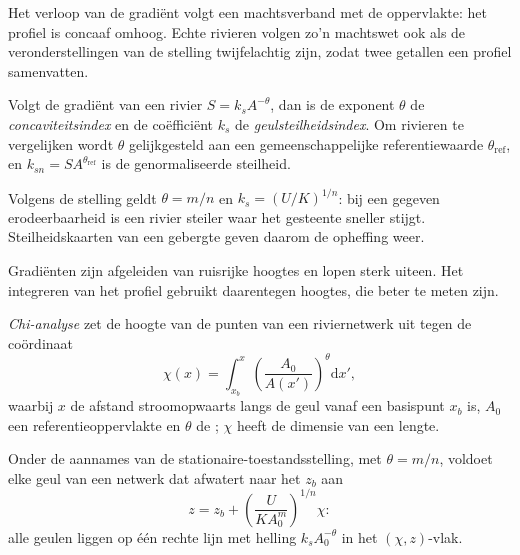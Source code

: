Het verloop van de gradiënt volgt een machtsverband met de oppervlakte: het profiel is
concaaf omhoog. Echte rivieren volgen zo'n machtswet ook als de veronderstellingen van de stelling
twijfelachtig zijn, zodat twee getallen een profiel samenvatten.

\begin{definition}\label{def:b3:quantitative-geomorphology:indices}
Volgt de gradiënt van een rivier $S = k_s A^{-\theta}$, dan is de exponent
$\theta$ de \emph{concaviteitsindex} en de
coëfficiënt $k_s$ de \emph{geulsteilheidsindex}.
Om rivieren te vergelijken wordt $\theta$ gelijkgesteld aan een gemeenschappelijke referentiewaarde
$\theta_{\mathrm{ref}}$, en $k_{sn} = S A^{\theta_{\mathrm{ref}}}$ is de
genormaliseerde steilheid.
\end{definition}

Volgens de stelling geldt $\theta = m/n$ en $k_s = (U/K)^{1/n}$: bij een gegeven
erodeerbaarheid is een rivier steiler waar het gesteente sneller stijgt. Steilheidskaarten van een
gebergte geven daarom de opheffing weer.


Gradiënten zijn afgeleiden van ruisrijke hoogtes en lopen sterk uiteen. Het integreren
van het profiel gebruikt daarentegen hoogtes, die beter te meten zijn.

\begin{definition}\label{def:b3:quantitative-geomorphology:chi}
\emph{Chi-analyse} zet de hoogte van de punten
van een riviernetwerk uit tegen de coördinaat
\[
\chi(x) = \int_{x_b}^{x} \left(\frac{A_0}{A(x')}\right)^{\theta}
\mathrm{d}x' ,
\]
waarbij $x$ de afstand stroomopwaarts langs de geul vanaf een basispunt
$x_b$ is, $A_0$ een referentieoppervlakte en $\theta$ de ; $\chi$ heeft
de dimensie van een lengte.
\end{definition}

\begin{proposition}\label{prop:b3:quantitative-geomorphology:chi}
Onder de aannames van de stationaire-toestandsstelling, met $\theta = m/n$,
voldoet elke geul van een netwerk dat afwatert naar het  $z_b$ aan
\[
z = z_b + \left(\frac{U}{K A_0^{m}}\right)^{1/n} \chi :
\]
alle geulen liggen op één rechte lijn met helling $k_s A_0^{-\theta}$ in het
$(\chi, z)$-vlak.
\end{proposition}

